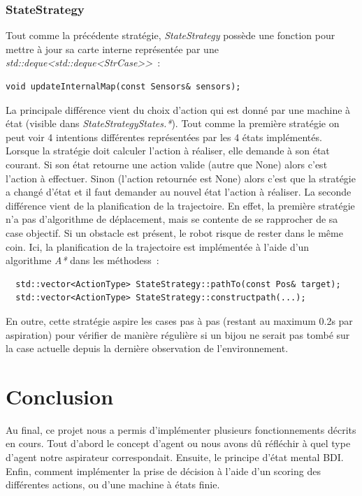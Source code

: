 \documentclass{article}
\begin{document}
\subsubsection{StateStrategy}

Tout comme la précédente stratégie, \emph{StateStrategy} possède une fonction pour mettre à jour sa carte interne représentée par une \emph{std::deque<std::deque<StrCase>>}~:
\begin{verbatim}
void updateInternalMap(const Sensors& sensors);
\end{verbatim}
La principale différence vient du choix d'action qui est donné par une machine à
état (visible dans \emph{StateStrategyStates.*}). Tout comme la première
stratégie on peut voir 4 intentions différentes représentées par les 4 états
implémentés. Lorsque la stratégie doit calculer l'action à réaliser, elle
demande à son état courant. Si son état retourne une action valide (autre que
None) alors c'est l'action à effectuer. Sinon (l'action retournée est None)
alors c'est que la stratégie a changé d'état et il faut demander au nouvel état
l'action à réaliser.
La seconde différence vient de la planification de la trajectoire. En effet, la
première stratégie n'a pas d'algorithme de déplacement, mais se contente de se
rapprocher de sa case objectif. Si un obstacle est présent, le robot risque de
rester dans le même coin. Ici, la planification de la trajectoire est
implémentée à l'aide d'un algorithme \emph{A*} dans les méthodess~:
\begin{verbatim}
  std::vector<ActionType> StateStrategy::pathTo(const Pos& target);
  std::vector<ActionType> StateStrategy::constructpath(...);
\end{verbatim}

En outre, cette stratégie aspire les cases pas à pas (restant au maximum 0.2s par
aspiration) pour vérifier de manière régulière si un bijou ne serait pas tombé
sur la case actuelle depuis la dernière observation de l'environnement.


\section{Conclusion}
Au final, ce projet nous a permis d'implémenter plusieurs fonctionnements
décrits en cours. Tout d'abord le concept d'agent ou nous avons dû réfléchir à
quel type d'agent notre aspirateur correspondait. Ensuite, le principe d'état
mental BDI. Enfin, comment implémenter la prise de décision à l'aide d'un
scoring des différentes actions, ou d'une machine à états finie.
\end{document}
